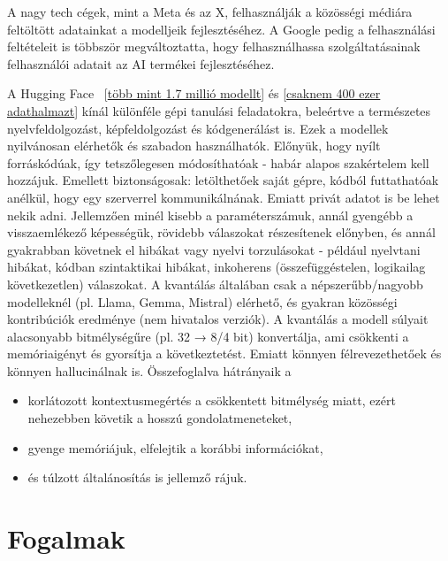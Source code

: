\documentclass[12pt]{report}
\theoremstyle{definition}
\begin{document}
A nagy tech cégek, mint a Meta és az X, felhasználják a közösségi médiára feltöltött adatainkat a modelljeik fejlesztéséhez. A Google pedig a felhasználási feltételeit is többször megváltoztatta, hogy felhasználhassa szolgáltatásainak felhasználói adatait az AI termékei fejlesztéséhez. ~\cite{tan2024terms}


A Hugging Face~\cite{wolf2019huggingface} [\href{https://huggingface.co/models}{több mint 1.7 millió modellt}] és [\href{https://huggingface.co/datasets}{csaknem 400 ezer adathalmazt}] kínál különféle gépi tanulási feladatokra, beleértve a természetes nyelvfeldolgozást, képfeldolgozást és kódgenerálást is. Ezek a modellek nyilvánosan elérhetők és szabadon használhatók.
Előnyük, hogy nyílt forráskódúak, így tetszőlegesen módosíthatóak - habár alapos szakértelem kell hozzájuk. Emellett biztonságosak: letölthetőek saját gépre, kódból futtathatóak anélkül, hogy egy szerverrel kommunikálnának. Emiatt privát adatot is be lehet nekik adni. Jellemzően minél kisebb a paraméterszámuk, annál gyengébb a visszaemlékező képességük, rövidebb válaszokat részesítenek előnyben, és annál gyakrabban követnek el hibákat vagy nyelvi torzulásokat - például nyelvtani hibákat, kódban szintaktikai hibákat, inkoherens (összefüggéstelen, logikailag következetlen) válaszokat. A kvantálás általában csak a népszerűbb/nagyobb modelleknél (pl. Llama, Gemma, Mistral) elérhető, és gyakran közösségi kontribúciók eredménye (nem hivatalos verziók). A kvantálás a modell súlyait alacsonyabb bitmélységűre (pl. 32 → 8/4 bit) konvertálja, ami csökkenti a memóriaigényt és gyorsítja a következtetést. Emiatt könnyen félrevezethetőek és könnyen hallucinálnak is. Összefoglalva hátrányaik a
\begin{itemize}
	\item
	      korlátozott kontextusmegértés a csökkentett bitmélység miatt, ezért nehezebben követik a hosszú gondolatmeneteket,
	\item
	      gyenge memóriájuk, elfelejtik a korábbi információkat,
	\item
	      és túlzott általánosítás is jellemző rájuk.
\end{itemize}

\clearpage

\section*{Fogalmak}

\end{document}
